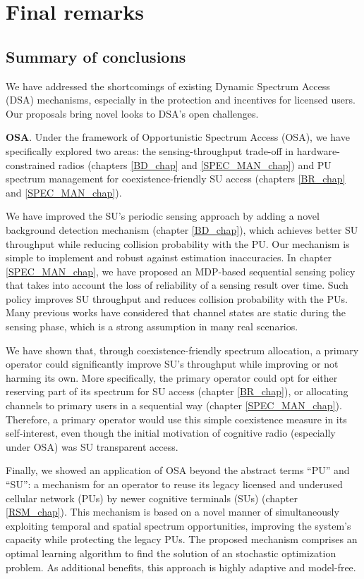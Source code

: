 \chapter{Final remarks}\label{Conclusion_chap}

\section{Summary of conclusions} %

We have addressed the shortcomings of existing Dynamic Spectrum Access (DSA) mechanisms, especially in the protection and incentives for licensed users. Our proposals bring novel looks to DSA's open challenges. 

\textbf{OSA}. Under the framework of Opportunistic Spectrum Access (OSA), we have specifically explored two areas: the sensing-throughput trade-off in hardware-constrained radios (chapters \ref{BD_chap} and \ref{SPEC_MAN_chap}) and PU spectrum management for coexistence-friendly SU access (chapters \ref{BR_chap} and \ref{SPEC_MAN_chap}). 

We have improved the SU's periodic sensing approach by adding a novel background detection mechanism (chapter \ref{BD_chap}), which achieves better SU throughput while reducing collision probability with the PU. Our mechanism is simple to implement and robust against estimation inaccuracies. In chapter \ref{SPEC_MAN_chap}, we have proposed an MDP-based sequential sensing policy that takes into account the loss of reliability of a sensing result over time. Such policy improves SU throughput and reduces collision probability with the PUs. Many previous works have considered that channel states are static during the sensing phase, which is a strong assumption in many real scenarios. 

We have shown that, through coexistence-friendly spectrum allocation, a primary operator could significantly improve SU's throughput while improving or not harming its own. More specifically, the primary operator could opt for either reserving part of its spectrum for SU access (chapter \ref{BR_chap}), or allocating channels to primary users in a sequential way (chapter \ref{SPEC_MAN_chap}). 
Therefore, a primary operator would use this simple coexistence measure in its self-interest, even though the initial motivation of cognitive radio (especially under OSA) was SU transparent access. 

Finally, we showed an application of OSA beyond the abstract terms \enquote{PU} and \enquote{SU}: a mechanism for an operator to reuse its legacy licensed and underused cellular network (PUs) by newer cognitive terminals (SUs) (chapter \ref{RSM_chap}). This mechanism is based on a novel manner of simultaneously exploiting temporal and spatial spectrum opportunities, improving the system's capacity while protecting the legacy PUs. The proposed mechanism comprises an optimal learning algorithm to find the solution of an stochastic optimization problem. As additional benefits, this approach is highly adaptive and model-free.


